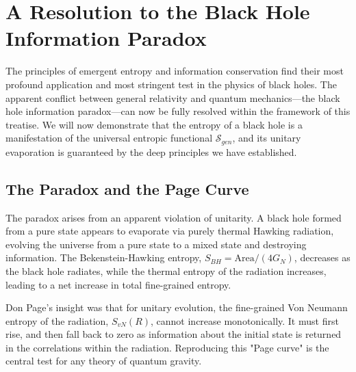 \documentclass[11pt, letterpaper]{report}
\theoremstyle{plain} %
\theoremstyle{definition} %
\theoremstyle{remark} %
\begin{document}
\section{A Resolution to the Black Hole Information Paradox}
\label{sec:bh_info_paradox_resolution}

The principles of emergent entropy and information conservation find their most profound application and most stringent test in the physics of black holes. The apparent conflict between general relativity and quantum mechanics—the black hole information paradox—can now be fully resolved within the framework of this treatise. We will now demonstrate that the entropy of a black hole is a manifestation of the universal entropic functional $\mathcal{S}_{gen}$, and its unitary evaporation is guaranteed by the deep principles we have established.

\subsection{The Paradox and the Page Curve}
The paradox arises from an apparent violation of unitarity. A black hole formed from a pure state appears to evaporate via purely thermal Hawking radiation, evolving the universe from a pure state to a mixed state and destroying information. The Bekenstein-Hawking entropy, $S_{BH} = \text{Area}/(4G_N)$, decreases as the black hole radiates, while the thermal entropy of the radiation increases, leading to a net increase in total fine-grained entropy.

Don Page's insight was that for unitary evolution, the fine-grained Von Neumann entropy of the radiation, $S_{vN}(R)$, cannot increase monotonically. It must first rise, and then fall back to zero as information about the initial state is returned in the correlations within the radiation. Reproducing this "Page curve" is the central test for any theory of quantum gravity.
\end{document}
